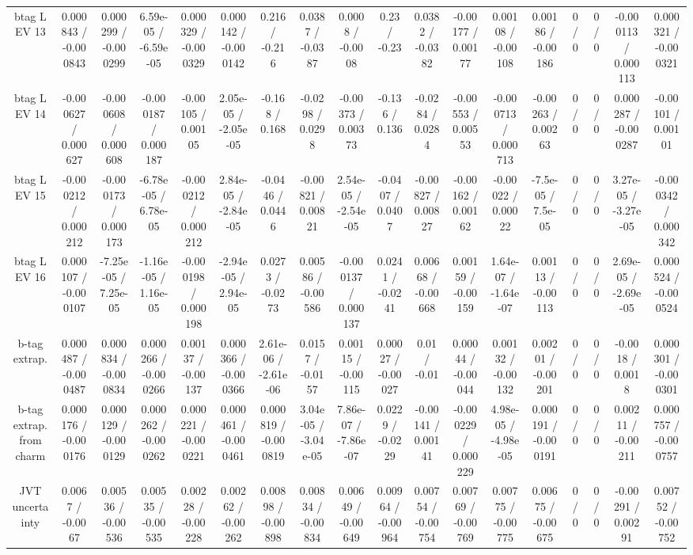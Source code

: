 \documentclass[10pt]{article}
\begin{document}
\begin{table}[htbp]
\begin{center}
\begin{tabular}{|c|c|c|c|c|c|c|c|c|c|c|c|c|c|c|c|c|c|}
  btag L EV 13 & 0.000843 / -0.000843 & 0.000299 / -0.000299 & 6.59e-05 / -6.59e-05 & 0.000329 / -0.000329 & 0.000142 / -0.000142 & 0.216 / -0.216 & 0.0387 / -0.0387 & 0.0008 / -0.0008 & 0.23 / -0.23 & 0.0382 / -0.0382 & -0.00177 / 0.00177 & 0.00108 / -0.00108 & 0.00186 / -0.00186 & 0 / 0 & 0 / 0 & -0.000113 / 0.000113 & 0.000321 / -0.000321 \\ 
  btag L EV 14 & -0.000627 / 0.000627 & -0.000608 / 0.000608 & -0.000187 / 0.000187 & -0.00105 / 0.00105 & 2.05e-05 / -2.05e-05 & -0.168 / 0.168 & -0.0298 / 0.0298 & -0.00373 / 0.00373 & -0.136 / 0.136 & -0.0284 / 0.0284 & -0.00553 / 0.00553 & -0.000713 / 0.000713 & -0.00263 / 0.00263 & 0 / 0 & 0 / 0 & 0.000287 / -0.000287 & -0.00101 / 0.00101 \\ 
  btag L EV 15 & -0.000212 / 0.000212 & -0.000173 / 0.000173 & -6.78e-05 / 6.78e-05 & -0.000212 / 0.000212 & 2.84e-05 / -2.84e-05 & -0.0446 / 0.0446 & -0.00821 / 0.00821 & 2.54e-05 / -2.54e-05 & -0.0407 / 0.0407 & -0.00827 / 0.00827 & -0.00162 / 0.00162 & -0.00022 / 0.00022 & -7.5e-05 / 7.5e-05 & 0 / 0 & 0 / 0 & 3.27e-05 / -3.27e-05 & -0.000342 / 0.000342 \\ 
  btag L EV 16 & 0.000107 / -0.000107 & -7.25e-05 / 7.25e-05 & -1.16e-05 / 1.16e-05 & -0.000198 / 0.000198 & -2.94e-05 / 2.94e-05 & 0.0273 / -0.0273 & 0.00586 / -0.00586 & -0.000137 / 0.000137 & 0.0241 / -0.0241 & 0.00668 / -0.00668 & 0.00159 / -0.00159 & 1.64e-07 / -1.64e-07 & 0.00113 / -0.00113 & 0 / 0 & 0 / 0 & 2.69e-05 / -2.69e-05 & 0.000524 / -0.000524 \\ 
  b-tag extrap. & 0.000487 / -0.000487 & 0.000834 / -0.000834 & 0.000266 / -0.000266 & 0.00137 / -0.00137 & 0.000366 / -0.000366 & 2.61e-06 / -2.61e-06 & 0.0157 / -0.0157 & 0.00115 / -0.00115 & 0.00027 / -0.00027 & 0.01 / -0.01 & 0.00044 / -0.00044 & 0.00132 / -0.00132 & 0.00201 / -0.00201 & 0 / 0 & 0 / 0 & -0.0018 / 0.0018 & 0.000301 / -0.000301 \\ 
  b-tag extrap. from charm & 0.000176 / -0.000176 & 0.000129 / -0.000129 & 0.000262 / -0.000262 & 0.000221 / -0.000221 & 0.000461 / -0.000461 & 0.000819 / -0.000819 & 3.04e-05 / -3.04e-05 & 7.86e-07 / -7.86e-07 & 0.0229 / -0.0229 & -0.00141 / 0.00141 & -0.000229 / 0.000229 & 4.98e-05 / -4.98e-05 & 0.000191 / -0.000191 & 0 / 0 & 0 / 0 & 0.00211 / -0.00211 & 0.000757 / -0.000757 \\ 
  JVT uncertainty & 0.0067 / -0.0067 & 0.00536 / -0.00536 & 0.00535 / -0.00535 & 0.00228 / -0.00228 & 0.00262 / -0.00262 & 0.00898 / -0.00898 & 0.00834 / -0.00834 & 0.00649 / -0.00649 & 0.00964 / -0.00964 & 0.00754 / -0.00754 & 0.00769 / -0.00769 & 0.00775 / -0.00775 & 0.00675 / -0.00675 & 0 / 0 & 0 / 0 & -0.00291 / 0.00291 & 0.00752 / -0.00752 \\ 

\end{tabular}
\end{center}
\end{table}
\end{document}
